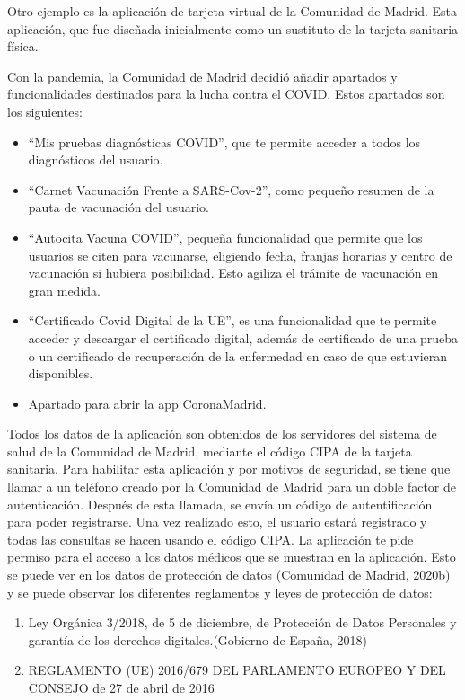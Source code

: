 \documentclass[11pt,a4paper,spanish]{article}
\begin{document}
Otro ejemplo es la aplicación de tarjeta virtual de la Comunidad de Madrid. Esta aplicación, que fue diseñada inicialmente como un sustituto de la tarjeta sanitaria física.

Con la pandemia, la Comunidad de Madrid decidió añadir apartados y funcionalidades destinados para la lucha contra el COVID. Estos apartados son los siguientes:

\begin{itemize}
\item “Mis pruebas diagnósticas COVID”, que te permite acceder a todos los diagnósticos del usuario.
\item “Carnet Vacunación Frente a SARS-Cov-2”, como pequeño resumen de la pauta de vacunación del usuario.
\item “Autocita Vacuna COVID”, pequeña funcionalidad que permite que los usuarios se citen para vacunarse, eligiendo fecha, franjas horarias y centro de vacunación si hubiera posibilidad. Esto agiliza el trámite de vacunación en gran medida.
\item “Certificado Covid Digital de la UE”, es una funcionalidad que te permite acceder y descargar el certificado digital, además de certificado de una prueba o un certificado de recuperación de la enfermedad en caso de que estuvieran disponibles.
\item Apartado para abrir la app CoronaMadrid.
\end{itemize} 

Todos los datos de la aplicación son obtenidos de los servidores del sistema de salud de la Comunidad de Madrid, mediante el código CIPA de la tarjeta sanitaria. Para habilitar esta aplicación y por motivos de seguridad, se tiene que llamar a un teléfono creado por la Comunidad de Madrid para un doble factor de autenticación. Después de esta llamada, se envía un código de autentificación para poder registrarse. Una vez realizado esto, el usuario estará registrado y todas las consultas se hacen usando el código CIPA. La aplicación te pide permiso para el acceso a los datos médicos que se muestran en la aplicación. Esto se puede ver en los datos de protección de datos (Comunidad de Madrid, 2020b) y se puede observar los diferentes reglamentos y leyes de protección de datos:

\begin{enumerate}
\item Ley Orgánica 3/2018, de 5 de diciembre, de Protección de Datos Personales y garantía de los derechos digitales.(Gobierno de España, 2018)
\item REGLAMENTO (UE) 2016/679 DEL PARLAMENTO EUROPEO Y DEL CONSEJO de 27 de abril de 2016
\end{enumerate} 
\end{document}
